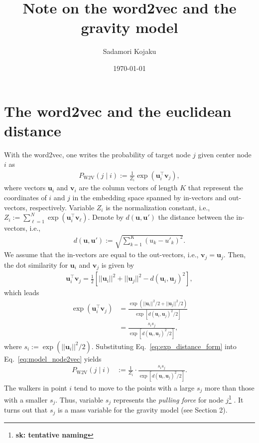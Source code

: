 \documentclass[12pt]{article} %
\def\given{\mid}
\def\vec#1{{\bm #1}}
\def\sada#1{\footnote{\color{light-blue}\textbf{sk: #1}} }
\begin{document}

\title{Note on the word2vec and the gravity model} %
\date{\today}
\author{Sadamori Kojaku}
\maketitle %

\section{The word2vec and the euclidean distance}

With the word2vec, one writes the probability of target node $j$ given center node $i$ as 
\begin{align}
  \label{eq:model_node2vec}
    P_{\text{W2V}}\left(j \given i\right) := \frac{1}{Z_i}\exp\left(\vec{u} ^\top _{i} \vec{v}_{j}\right), 
\end{align}
where vectors $\vec{u}_i$ and $\vec{v}_i$ are the column vectors of length $K$ that represent the coordinates of $i$ and $j$ in the embedding space spanned by in-vectors and out-vectors, respectively.
Variable $Z_i$ is the normalization constant, i.e., $Z_i:= \sum_{\ell=1}^N \exp\left(\vec{u} ^\top _{i} \vec{v}_{\ell}\right)$. 
Denote by $d(\vec{u},\vec{u}')$ the distance between the in-vectors, i.e., 
\begin{align}
    \label{eq:distance}
    d(\vec{u},\vec{u}'):= \sqrt{\sum_{k=1}^K \left(u_{k} - u'_{k}\right)^2}.
\end{align}
We assume that the in-vectors are equal to the out-vectors, i.e., $\vec{v}_j = \vec{u}_j$.
Then, the dot similarity for $\vec{u}_i$ and $\vec{v}_j$ is given by 
\begin{align}
    \label{eq:dotsim}
    \vec{u}_i ^\top \vec{v}_j = \frac{1}{2}\left[ ||\vec{u}_i||^2 + ||\vec{u}_j||^2 - d\left(\vec{u}_i, \vec{u}_j\right)^2 \right],
\end{align}
which leads 
\begin{align}
    \exp\left( \vec{u}_i ^\top \vec{v}_j \right) &= \frac{\exp\left( ||\vec{u}_i||^2/2 + ||\vec{u}_j||^2/2 \right)}{\exp\left[ d\left(\vec{u}_i, \vec{u}_j\right)^2 / 2 \right]} \nonumber \\
                                                 &= \frac{s_i s_j}{\exp\left[d\left(\vec{u}_i, \vec{u}_j\right)^2 / 2\right]}, \label{eq:exp_distance_form}
\end{align}
where $s_i:=\exp(||\vec{u} _i||^2/2)$. 
Substituting Eq.~\eqref{eq:exp_distance_form} into Eq.~\eqref{eq:model_node2vec} yields
\begin{align}
    \label{eq:model_node2vec_distance}
    P_{\text{W2V}}\left(j \given i\right) &:= \frac{1}{Z_i}\cdot \frac{s_is_j}{\exp\left[d\left(\vec{u}_i, \vec{u}_j\right)^2/2\right]}. 
\end{align}
The walkers in point $i$ tend to move to the points with a large $s_j$ more than those with a smaller $s_j$.
Thus, variable $s_j$ represents the {\it pulling force} for node $j$\sada{tentative naming}. 
It turns out that $s_j$ is a mass variable for the gravity model (see Section 2). 
\end{document}
